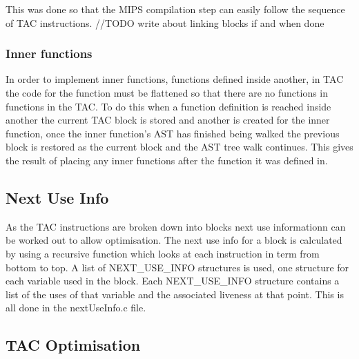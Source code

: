 \documentclass{article}
\begin{document}
\begin{center}
\end{center}

This was done so that the MIPS compilation step can easily follow the sequence of
TAC instructions. //TODO write about linking blocks if and when done

\subsubsection{Inner functions}

In order to implement inner functions, functions defined inside another, in TAC
the code for the function must be flattened so that there are no functions in functions
in the TAC. To do this when a function definition is reached inside another the current
TAC block is stored and another is created for the inner function, once the inner function's
AST has finished being walked the previous block is restored as the current block and
the AST tree walk continues. This gives the result of placing any inner functions after
the function it was defined in.

\subsection{Next Use Info}

As the TAC instructions are broken down into blocks next use informationn can be
worked out to allow optimisation. The next use info for a block is calculated by
using a recursive function which looks at each instruction in term from bottom
to top. A list of NEXT\_USE\_INFO structures is used, one structure for each variable
used in the block. Each NEXT\_USE\_INFO structure contains a list of the uses of that
variable and the associated liveness at that point. This is all done in the nextUseInfo.c file.

\subsection{TAC Optimisation}
\end{document}
